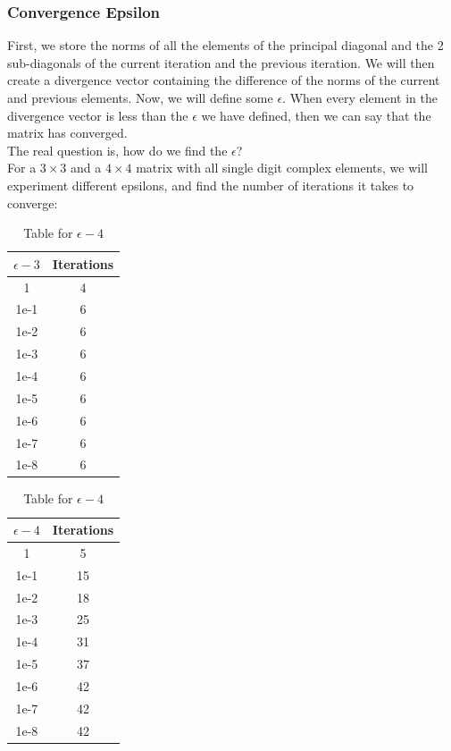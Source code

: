 \documentclass[12pt]{article}
\begin{document}
		\subsubsection{Convergence Epsilon}
		First, we store the norms of all the elements of the principal diagonal and the 2 sub-diagonals of the current iteration and the previous iteration. We will then create a divergence vector containing the difference of the norms of the current and previous elements.
		Now, we will define some $\epsilon$. When every element in the divergence vector is less than the $\epsilon$ we have defined, then we can say that the matrix has converged.\\ 
		The real question is, how do we find the $\epsilon$?\\
		For a $3\times 3$ and a $4 \times 4$ matrix with all single digit complex elements, we will experiment different epsilons, and find the number of iterations it takes to converge:
		\begin{table}[ht]
			\centering
			\begin{minipage}{0.45\textwidth}
				\centering
				\begin{tabular}{|c|c|}
					\hline
					$\epsilon - 3$ & Iterations \\
					\hline
					1 & 4 \\
					1e-1 & 6 \\
					1e-2 & 6 \\
					1e-3 & 6 \\
					1e-4 & 6 \\
					1e-5 & 6 \\
					1e-6 & 6 \\
					1e-7 & 6 \\
					1e-8 & 6 \\
					\hline
				\end{tabular}
				\caption{Table for $\epsilon - 3$}
			\end{minipage}%
			\hspace{0.5cm}  %
			\begin{minipage}{0.45\textwidth}
				\centering
				\begin{tabular}{|c|c|}
					\hline
					$\epsilon - 4$ & Iterations \\
					\hline
					1 & 5 \\
					1e-1 & 15 \\
					1e-2 & 18 \\
					1e-3 & 25 \\
					1e-4 & 31 \\
					1e-5 & 37 \\
					1e-6 & 42 \\
					1e-7 & 42 \\
					1e-8 & 42 \\
					\hline
				\end{tabular}
				\caption{Table for $\epsilon - 4$}
			\end{minipage}
		\end{table}
\end{document}
